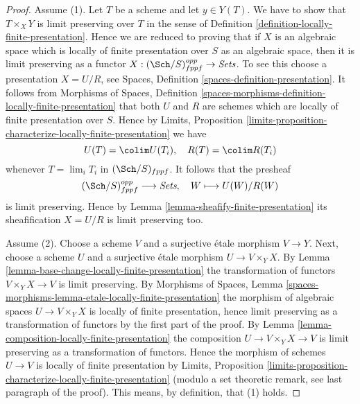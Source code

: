 \begin{proof}
Assume (1). Let $T$ be a scheme and let $y \in Y(T)$. We have to show that
$T \times_X Y$ is limit preserving over $T$ in the sense of
Definition \ref{definition-locally-finite-presentation}.
Hence we are reduced to proving that if $X$ is an algebraic space which
is locally of finite presentation over $S$ as an algebraic space, then it
is limit preserving as a functor
$X : (\Sch/S)_{fppf}^{opp} \to \textit{Sets}$.
To see this choose a presentation $X = U/R$, see
Spaces, Definition \ref{spaces-definition-presentation}.
It follows from
Morphisms of Spaces,
Definition \ref{spaces-morphisms-definition-locally-finite-presentation}
that both $U$ and $R$ are schemes which are locally of finite presentation
over $S$. Hence by
Limits, Proposition
\ref{limits-proposition-characterize-locally-finite-presentation}
we have
$$
U(T) = \colim U(T_i), \quad
R(T) = \colim R(T_i)
$$
whenever $T = \lim_i T_i$ in $(\Sch/S)_{fppf}$. It follows
that the presheaf
$$
(\Sch/S)_{fppf}^{opp} \longrightarrow \textit{Sets}, \quad
W \longmapsto U(W)/R(W)
$$
is limit preserving. Hence by
Lemma \ref{lemma-sheafify-finite-presentation}
its sheafification $X = U/R$ is limit preserving too.

\medskip\noindent
Assume (2). Choose a scheme $V$ and a surjective \'etale morphism
$V \to Y$. Next, choose a scheme $U$ and a surjective \'etale morphism
$U \to V \times_Y X$. By
Lemma \ref{lemma-base-change-locally-finite-presentation}
the transformation of functors $V \times_Y X \to V$ is limit preserving. By
Morphisms of Spaces,
Lemma \ref{spaces-morphisms-lemma-etale-locally-finite-presentation}
the morphism of algebraic spaces $U \to V \times_Y X$ is locally
of finite presentation, hence limit preserving as
a transformation of functors by the first part of the proof. By
Lemma \ref{lemma-composition-locally-finite-presentation}
the composition $U \to V \times_Y X \to V$ is limit preserving
as a transformation of functors. Hence
the morphism of schemes $U \to V$ is locally of finite presentation by
Limits, Proposition
\ref{limits-proposition-characterize-locally-finite-presentation}
(modulo a set theoretic remark, see last paragraph of the proof).
This means, by definition, that (1) holds.


\end{proof}
